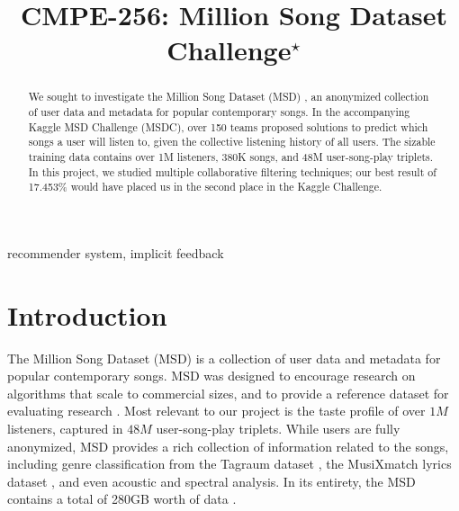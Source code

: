 \documentclass[conference]{IEEEtran}
\begin{document}
\title{\textsc{CMPE-256}: Million Song Dataset Challenge$^\star$}
\date{}


\author{
\and 
{}
\and 
{}
}

\maketitle

\begin{abstract}
We sought to investigate the Million Song Dataset (MSD)
\cite{Bertin-Mahieux2011}, an anonymized collection of user data and metadata
for popular contemporary songs. In the accompanying Kaggle MSD Challenge
(MSDC), over 150
teams proposed solutions to predict which songs a user will listen
to, given the collective listening history of all users.
The sizable training data contains over 1M listeners, 380K songs,
and 48M user-song-play triplets.
In this project,
we studied multiple collaborative filtering techniques; our best
result of 17.453\% would have placed us in the second place in the Kaggle
Challenge.
\end{abstract}

\begin{IEEEkeywords}
recommender system, implicit feedback
\end{IEEEkeywords}

\section{Introduction}

The Million Song Dataset (MSD) is
a collection of user data and metadata for popular contemporary songs.
MSD was designed to encourage research on algorithms that scale to commercial sizes,
and to provide a reference dataset for evaluating research \cite{Bertin-Mahieux2011}.
Most relevant to
our project is the taste profile of over $1M$ listeners, captured in $48M$
user-song-play triplets. While users are fully anonymized, MSD provides a rich collection
of information related to the songs, including
genre classification from the Tagraum dataset \cite{schreiber2015improving},
the MusiXmatch lyrics dataset \cite{Bertin-Mahieux2011},
and even acoustic and spectral analysis. In its
entirety, the MSD contains a total of 280GB worth of data
\cite{Bertin-Mahieux2011}.
\end{document}
